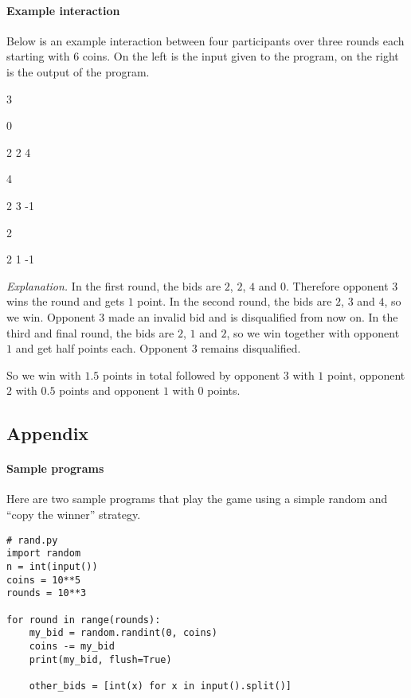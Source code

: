 \documentclass[
    a4paper,
    12pt,
    parskip=half,
    headings=standardclasses,
    footskip=0pt,
    footlines=1,
    headheight=80in
]{scrartcl}
\newcommand{\lgrey}{black!5}
\begin{document}
\paragraph*{Example interaction} Below is an example interaction between four participants over three rounds
each starting with $6$ coins. On the left is the input given to the program, on the right is the output of the program.

\begin{tcolorbox}[colback=\lgrey,fontupper=\small\ttfamily]
3

\hfill0

2 2 4

\hfill4

2 3 -1

\hfill2

2 1 -1
\end{tcolorbox}

\textit{Explanation.} In the first round, the bids are $2$, $2$, $4$ and $0$. Therefore opponent $3$ wins the round and gets $1$ point.
In the second round, the bids are $2$, $3$ and $4$, so we win. Opponent $3$ made an invalid bid and is disqualified from now on.
In the third and final round, the bids are $2$, $1$ and $2$, so we win together with opponent $1$ and get half points each.
Opponent $3$ remains disqualified.

So we win with $1.5$ points in total followed by opponent $3$ with $1$ point, opponent $2$ with $0.5$ points and opponent $1$ with $0$ points.

\subsection*{Appendix}

\paragraph*{Sample programs}\label{sample-programs}

Here are two sample programs that play the game using a simple random and ``copy the
winner'' strategy.

\begin{verbatim}
# rand.py
import random
n = int(input())
coins = 10**5
rounds = 10**3

for round in range(rounds):
    my_bid = random.randint(0, coins)
    coins -= my_bid
    print(my_bid, flush=True)
    
    other_bids = [int(x) for x in input().split()]
\end{verbatim}
\end{document}
